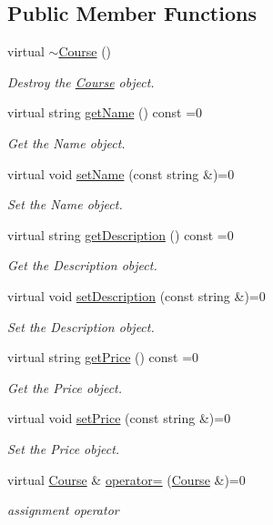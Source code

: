 \subsection*{Public Member Functions}
\begin{DoxyCompactItemize}
\item 
virtual \hyperlink{classCourse_a80fed7c3f708fc4800517140cfbbb024}{$\sim$\+Course} ()
\begin{DoxyCompactList}\small\item\em Destroy the \hyperlink{classCourse}{Course} object. \end{DoxyCompactList}\item 
virtual string \hyperlink{classCourse_aaf464936166f94c89b97671798996088}{get\+Name} () const =0
\begin{DoxyCompactList}\small\item\em Get the Name object. \end{DoxyCompactList}\item 
virtual void \hyperlink{classCourse_abf95977e0ba0285c17cac6845f78c4e8}{set\+Name} (const string \&)=0
\begin{DoxyCompactList}\small\item\em Set the Name object. \end{DoxyCompactList}\item 
virtual string \hyperlink{classCourse_a19bced7786d959ca6110afc6d00bc751}{get\+Description} () const =0
\begin{DoxyCompactList}\small\item\em Get the Description object. \end{DoxyCompactList}\item 
virtual void \hyperlink{classCourse_a67f5badeddc228e5a4e4dde35f794d97}{set\+Description} (const string \&)=0
\begin{DoxyCompactList}\small\item\em Set the Description object. \end{DoxyCompactList}\item 
virtual string \hyperlink{classCourse_a7046438034cb468602eecf2c02013c00}{get\+Price} () const =0
\begin{DoxyCompactList}\small\item\em Get the Price object. \end{DoxyCompactList}\item 
virtual void \hyperlink{classCourse_a0a04b90e278236abbe5dbe40890cb3d0}{set\+Price} (const string \&)=0
\begin{DoxyCompactList}\small\item\em Set the Price object. \end{DoxyCompactList}\item 
virtual \hyperlink{classCourse}{Course} \& \hyperlink{classCourse_a460bb6c7b1acb7ecf6a702a3e890e32e}{operator=} (\hyperlink{classCourse}{Course} \&)=0
\begin{DoxyCompactList}\small\item\em assignment operator \end{DoxyCompactList}\end{DoxyCompactItemize}


